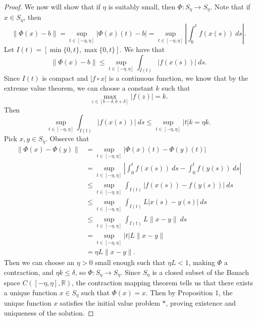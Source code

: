 \documentclass[11pt]{article}
\theoremstyle{definition}
\newcommand{\R}{\mathbb{R}}                      %
\begin{document}
\begin{proof}
    We now will show that if $\eta$ is suitably small, then $\Phi:S_\eta\to S_\eta$. Note that if $x\in S_\eta$, then
    $$
    \|\Phi(x)-b\|=\sup_{t\in[-\eta,\eta]}|\Phi(x)(t)-b|=\sup_{t\in[-\eta,\eta]} \left|\int_0^t f(x(s))~ds\right|.
    $$
    Let $I(t)=[\min\{0,t\},\max\{0,t\}]$. We have that
    $$
    \|\Phi(x)-b\|\leq \sup_{t\in[-\eta,\eta]} \int_{I(t)} |f(x(s))|~ds.
    $$
    Since $I(t)$ is compact and $|f\circ x|$ is a continuous function, we know that by the extreme value theorem, we can choose a constant $k$ such that 
    $$
    \max_{z\in[b-\delta,b+\delta]}|f(z)|=k.
    $$
    Then 
    $$
    \sup_{t\in[-\eta,\eta]}\int_{I(t)}|f(x(s))|~ds\leq \sup_{t\in[-\eta,\eta]}|t|k=\eta k.
    $$
    Pick $x,y\in S_\eta$. Observe that
    $$
    \begin{aligned}
        \|\Phi(x)-\Phi(y)\|&=\sup_{t\in[-\eta,\eta]}|\Phi(x)(t)-\Phi(y)(t)|\\
        &= \sup_{t\in[-\eta,\eta]} \left|\int_0^t f(x(s))~ds-\int_0^t f(y(s))~ds\right|\\
        &\leq \sup_{t\in[-\eta,\eta]}\int_{I(t)} |f(x(s))-f(y(s))|~ds\\
        &\leq \sup_{t\in[-\eta,\eta]}\int_{I(t)} L|x(s)-y(s)|~ds\\
        &\leq \sup_{t\in[-\eta,\eta]}\int_{I(t)} L\|x-y\|~ds\\
        &=\sup_{t\in[-\eta,\eta]} |t|L\|x-y\|\\
        &=\eta L\|x-y\|.
    \end{aligned}
    $$
    Then we can choose an $\eta>0$ small enough such that $\eta L<1$, making $\Phi$ a contraction, and $\eta k\leq \delta$, so $\Phi:S_\eta\to S_\eta$. Since $S_\eta$ is a closed subset of the Banach space $C([-\eta,\eta],\R)$, the contraction mapping theorem tells us that there exists a unique function $x\in S_\eta$ such that $\Phi(x)=x$. Then by Proposition 1, the unique function $x$ satisfies the initial value problem $*$, proving existence and uniqueness of the solution.
\end{proof}
\end{document}
